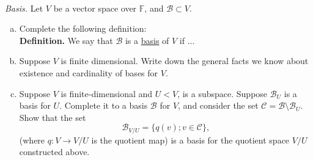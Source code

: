 \documentclass{article}
\begin{document}
\begin{problem} \\ 
   \textit{Basis.} Let $V$ be a vector space over $\mathbb{F}$, and $\mathscr{B} \subset V$.
   \begin{enumerate}[a)]
    \item Complete the following definition: \\ \textbf{Definition.} We say that $\mathscr{B}$ is a \underline{basis} of $V$ if ...
    \item Suppose $V$ is finite dimensional. Write down the general facts we know about existence and cardinality of bases for $V$.
    \item Suppose $V$ is finite-dimensional and $U < V$, is a subspace. Suppose $\mathscr{B}_U$ is a basis for $U$. Complete it to a basis $\mathscr{B}$ for $V$, and consider the set $\mathscr{C} = \mathscr{B} \setminus \mathscr{B}_U$. Show that the set
    \[
      \mathscr{B}_{V/U} = \{q(v) ; v \in \mathscr{C}\},
    \]
    (where $q: V \to V/U$ is the quotient map) is a basis for the quotient space $V/U$ constructed above.
   \end{enumerate}
\end{problem}
\end{document}
